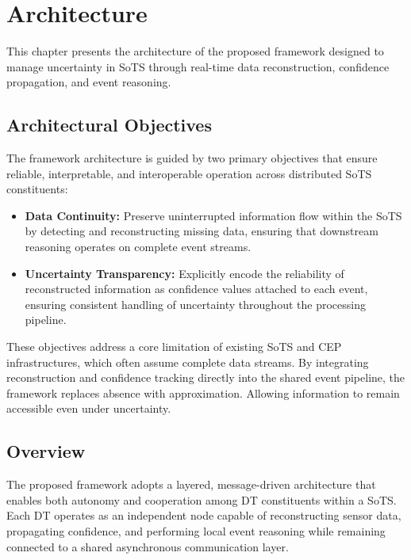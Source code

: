 \chapter{Architecture}
\label{ch:architecture}

This chapter presents the architecture of the proposed framework designed to manage uncertainty in SoTS through real-time data reconstruction, confidence propagation, and event reasoning. 

\section{Architectural Objectives}

The framework architecture is guided by two primary objectives that ensure reliable, interpretable, and interoperable operation across distributed SoTS constituents:

\begin{itemize}
    \item \textbf{Data Continuity:} Preserve uninterrupted information flow within the SoTS by detecting and reconstructing missing data, ensuring that downstream reasoning operates on complete event streams.  

   \item \textbf{Uncertainty Transparency:} Explicitly encode the reliability of reconstructed information as confidence values attached to each event, ensuring consistent handling of uncertainty throughout the processing pipeline.
\end{itemize}

These objectives address a core limitation of existing SoTS and CEP infrastructures, which often assume complete data streams. By integrating reconstruction and confidence tracking directly into the shared event pipeline, the framework replaces absence with approximation. Allowing information to remain accessible even under uncertainty.

\section{Overview}

The proposed framework adopts a layered, message-driven architecture that enables both autonomy and cooperation among DT constituents within a SoTS. Each DT operates as an independent node capable of reconstructing sensor data, propagating confidence, and performing local event reasoning while remaining connected to a shared asynchronous communication layer.

